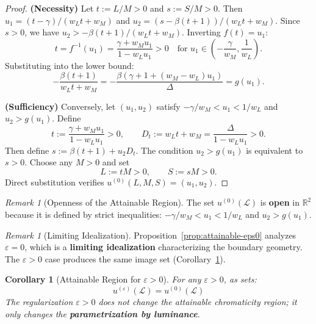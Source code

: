 \documentclass[11pt]{article}
\theoremstyle{plain}
\newtheorem{corollary}[theorem]{Corollary}
\theoremstyle{definition}
\theoremstyle{remark}
\newtheorem{remark}[theorem]{Remark}
\newcommand{\R}{\mathbb{R}}
\begin{document}
\begin{proof}
\textbf{(Necessity)} Let $t := L/M > 0$ and $s := S/M > 0$. Then
$u_1 = (t - \gamma)/(w_L t + w_M)$ and $u_2 = (s - \beta(t+1))/(w_L t + w_M)$.
Since $s > 0$, we have $u_2 > -\beta(t+1)/(w_L t + w_M)$. Inverting $f(t) = u_1$:
\begin{equation}
t = f^{-1}(u_1) = \frac{\gamma + w_M u_1}{1 - w_L u_1} > 0 \quad \text{for } u_1 \in \left(-\frac{\gamma}{w_M}, \frac{1}{w_L}\right).
\end{equation}
Substituting into the lower bound:
\begin{equation}
-\frac{\beta(t+1)}{w_L t + w_M} = -\frac{\beta(\gamma + 1 + (w_M - w_L)u_1)}{\Delta} = g(u_1).
\end{equation}

\textbf{(Sufficiency)} Conversely, let $(u_1, u_2)$ satisfy $-\gamma/w_M < u_1 < 1/w_L$ and $u_2 > g(u_1)$. Define
\begin{equation}
t := \frac{\gamma + w_M u_1}{1 - w_L u_1} > 0, \qquad D_t := w_L t + w_M = \frac{\Delta}{1 - w_L u_1} > 0.
\end{equation}
Then define $s := \beta(t+1) + u_2 D_t$. The condition $u_2 > g(u_1)$ is equivalent to $s > 0$. Choose any $M > 0$ and set
\begin{equation}
L := tM > 0, \qquad S := sM > 0.
\end{equation}
Direct substitution verifies $u^{(0)}(L, M, S) = (u_1, u_2)$.
\end{proof}

\begin{remark}[Openness of the Attainable Region]
The set $u^{(0)}(\mathcal{L})$ is \textbf{open} in $\R^2$ because it is defined by strict inequalities: $-\gamma/w_M < u_1 < 1/w_L$ and $u_2 > g(u_1)$.
\end{remark}

\begin{remark}[Limiting Idealization]
Proposition~\ref{prop:attainable-eps0} analyzes $\varepsilon = 0$, which is a \textbf{limiting idealization} characterizing the boundary geometry. The $\varepsilon > 0$ case produces the same image set (Corollary~\ref{cor:attainable-epspos}).
\end{remark}

\begin{corollary}[Attainable Region for $\varepsilon > 0$]
\label{cor:attainable-epspos}
For any $\varepsilon > 0$, as sets:
\begin{equation}
\boxed{u^{(\varepsilon)}(\mathcal{L}) = u^{(0)}(\mathcal{L})}
\end{equation}
The regularization $\varepsilon > 0$ does not change the attainable chromaticity region; it only changes the \textbf{parametrization by luminance}.
\end{corollary}
\end{document}
